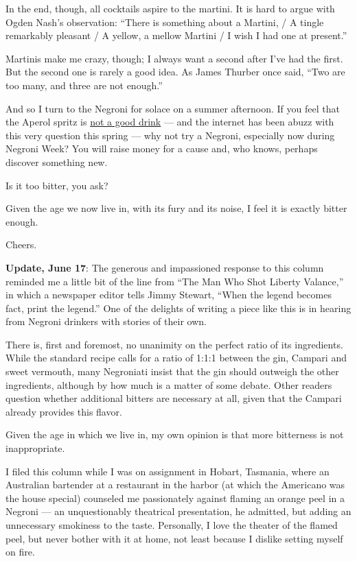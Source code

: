 In the end, though, all cocktails aspire to the martini. It is hard to
argue with Ogden Nash's observation: ``There is something about a
Martini, / A tingle remarkably pleasant / A yellow, a mellow Martini / I
wish I had one at present.''

Martinis make me crazy, though; I always want a second after I've had
the first. But the second one is rarely a good idea. As James Thurber
once said, ``Two are too many, and three are not enough.''

And so I turn to the Negroni for solace on a summer afternoon. If you
feel that the Aperol spritz is
\href{https://www.nytimes3xbfgragh.onion/2019/05/09/dining/drinks/aperol-spritz.html}{not
a good drink} --- and the internet has been abuzz with this very
question this spring --- why not try a Negroni, especially now during
Negroni Week? You will raise money for a cause and, who knows, perhaps
discover something new.

Is it too bitter, you ask?

Given the age we now live in, with its fury and its noise, I feel it is
exactly bitter enough.

Cheers.

\textbf{Update, June 17}: The generous and impassioned response to this
column reminded me a little bit of the line from ``The Man Who Shot
Liberty Valance,'' in which a newspaper editor tells Jimmy Stewart,
``When the legend becomes fact, print the legend.'' One of the delights
of writing a piece like this is in hearing from Negroni drinkers with
stories of their own.

There is, first and foremost, no unanimity on the perfect ratio of its
ingredients. While the standard recipe calls for a ratio of 1:1:1
between the gin, Campari and sweet vermouth, many Negroniati insist that
the gin should outweigh the other ingredients, although by how much is a
matter of some debate. Other readers question whether additional bitters
are necessary at all, given that the Campari already provides this
flavor.

Given the age in which we live in, my own opinion is that more
bitterness is not inappropriate.

I filed this column while I was on assignment in Hobart, Tasmania, where
an Australian bartender at a restaurant in the harbor (at which the
Americano was the house special) counseled me passionately against
flaming an orange peel in a Negroni --- an unquestionably theatrical
presentation, he admitted, but adding an unnecessary smokiness to the
taste. Personally, I love the theater of the flamed peel, but never
bother with it at home, not least because I dislike setting myself on
fire.

